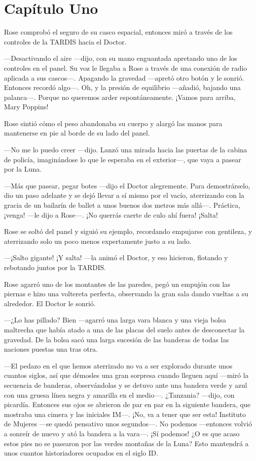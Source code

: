 \chapter*{Capítulo Uno}

Rose comprobó el seguro de su casco espacial, entonces miró a través de
los controles de la TARDIS hacia el Doctor.

---Desactivando el aire ---dijo, con su mano enguantada apretando uno de
los controles en el panel. Su voz le llegaba a Rose a través de una
conexión de radio aplicada a sus cascos---. Apagando la gravedad ---apretó
otro botón y le sonrió. Entonces recordó algo---. Oh, y la presión de
equilibrio ---añadió, bajando una palanca---. Porque no queremos arder
espontáneamente. ¡Vamos para arriba, Mary Poppins!

Rose sintió cómo el peso abandonaba su cuerpo y alargó las manos para
mantenerse en pie al borde de su lado del panel.

---No me lo puedo creer ---dijo. Lanzó una mirada hacia las puertas de la
cabina de policía, imaginándose lo que le esperaba en el exterior---, que
vaya a pasear por la Luna.

---Más que pasear, pegar botes ---dijo el Doctor alegremente. Para
demostrárselo, dio un paso adelante y se dejó llevar a sí mismo por el
vacío, aterrizando con la gracia de un bailarín de ballet a unos buenos
dos metros más allá---. Práctica, ¡venga! ---le dijo a Rose---. ¡No querrás
caerte de culo ahí fuera! ¡Salta!

Rose se soltó del panel y siguió su ejemplo, recordando empujarse con
gentileza, y aterrizando solo un poco menos expertamente justo a su
lado.

---¡Salto gigante! ¡Y salta! ---la animó el Doctor, y eso hicieron,
flotando y rebotando juntos por la TARDIS.

Rose agarró uno de los montantes de las paredes, pegó un empujón con las
piernas e hizo una voltereta perfecta, observando la gran sala dando
vueltas a su alrededor. El Doctor le sonrió.

---¿Lo has pillado? Bien ---agarró una larga vara blanca y una vieja
bolsa maltrecha que había atado a una de las placas del suelo antes de
desconectar la gravedad. De la bolsa sacó una larga sucesión de las
banderas de todas las naciones puestas una tras otra.

---El pedazo en el que hemos aterrizado no va a ser explorado durante
unos cuantos siglos, así que démosles una gran sorpresa cuando lleguen
aquí ---miró la secuencia de banderas, observándolas y se detuvo ante una
bandera verde y azul con una gruesa línea negra y amarilla en el
medio---. ¿Tanzania? ---dijo, con picardía. Entonces sus ojos se abrieron
de par en par en la siguiente bandera, que mostraba una cimera y las
iniciales IM---. ¡No, va a tener que ser esta! Instituto de Mujeres ---se
quedó pensativo unos segundos---. No podemos ---entonces volvió a sonreír
de nuevo y ató la bandera a la vara---. ¡Sí podemos! ¿O es que acaso
estos pies no se pasearon por las verdes montañas de la Luna? Esto
mantendrá a unos cuantos historiadores ocupados en el siglo ID.

